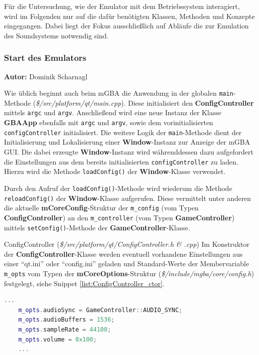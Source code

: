 \documentclass[11pt,a4paper]{scrartcl}
\newcommand{\AutorDominik} {
    \vspace{-4mm}
    \large \textbf{Autor:} Dominik Scharnagl \normalsize
    \vspace{2mm}
}
\begin{document}
F\"ur die Untersuchung, wie der Emulator mit dem Betriebssystem interagiert, wird im Folgenden nur auf die daf\"ur ben\"otigten Klassen, Methoden und Konzepte eingegangen. Dabei liegt der Fokus ausschlie{\ss}lich auf Abl\"aufe die zur Emulation des Soundsystems notwendig sind.

\subsubsection{Start des Emulators} \label{startdesemulators}
\AutorDominik

Wie \"ublich beginnt auch beim mGBA die Anwendung in der globalen \verb|main|-Methode (\textit{\$/src/platform/qt/main.cpp}). Diese initialisiert den \textbf{ConfigController} mittels \verb|argc| und \verb|argv|. Anschlie{\ss}end wird eine neue Instanz der Klasse \textbf{GBAApp} ebenfalls mit \verb|argc| und \verb|argv|, sowie dem vorinitialisierten \verb|configController| initialisiert. Die weitere Logik der \verb|main|-Methode dient der Initialisierung und Lokalisierung einer \textbf{Window}-Instanz zur Anzeige der mGBA GUI. Die dabei erzeugte \textbf{Window}-Instanz wird w\"ahrenddessen dazu aufgefordert die Einstellungen aus dem bereits initialisierten \verb|configController| zu laden. Hierzu wird die Methode \verb|loadConfig()| der \textbf{Window}-Klasse verwendet.

Durch den Aufruf der \verb|loadConfig()|-Methode wird wiederum die Methode \verb|reloadConfig()| der \textbf{Window}-Klasse aufgerufen. Diese vermittelt unter anderen die aktuelle \textbf{mCoreConfig}-Struktur der \verb|m_config| (vom Typen \textbf{ConfigController}) an den \verb|m_controller| (vom Typen \textbf{GameController}) mittels \verb|setConfig()|-Methode der \textbf{GameController}-Klasse.

\vspace{5mm}
\large ConfigController \normalsize(\textit{\$/src/platform/qt/ConfigController.h \& .cpp})
\vspace{2mm}\newline
Im Konstruktor der \textbf{ConfigController}-Klasse werden eventuell vorhandene Einstellungen aus einer \enquote{qt.ini} oder \enquote{config.ini} geladen und Standard-Werte der Membervariable \verb|m_opts| vom Typen der \textbf{mCoreOptions}-Struktur (\textit{\$/include/mgba/core/config.h}) festgelegt, siehe Snippet \ref{list:ConfigController_ctor}.

\vspace{5mm}
\begin{lstlisting}[language=C++, caption={Ausschnitt aus dem Konstruktor der ConfigController-Klasse}, label={list:ConfigController_ctor}]
    ...
	m_opts.audioSync = GameController::AUDIO_SYNC;
	m_opts.audioBuffers = 1536;
	m_opts.sampleRate = 44100;
	m_opts.volume = 0x100;
	...
\end{lstlisting}
\end{document}
